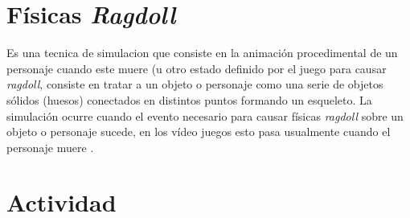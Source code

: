 \section{Físicas \emph{Ragdoll}}
Es una tecnica de simulacion que consiste en la animación procedimental de un personaje cuando este muere (u otro estado definido por el juego para causar \emph{ragdoll}, consiste en tratar a un objeto o personaje como una serie de objetos sólidos (huesos) conectados en distintos puntos formando un esqueleto. La simulación ocurre cuando el evento necesario para causar físicas \emph{ragdoll} sobre un objeto o personaje sucede, en los vídeo juegos esto pasa usualmente cuando el personaje muere \cite{eric_ragdoll}.

\section{Actividad}
